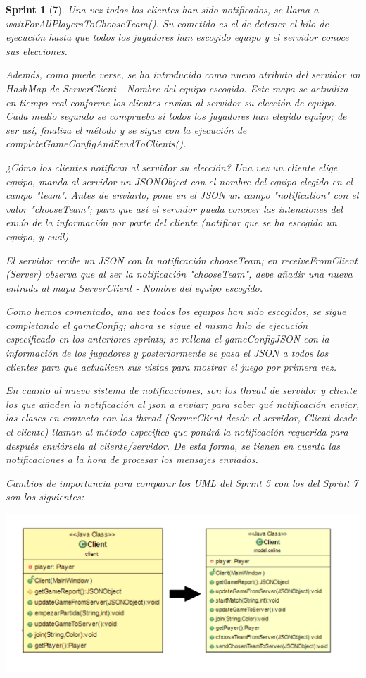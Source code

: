 \documentclass[12pt,a4paper,openright]{book}
\theoremstyle{break}
\newtheorem*{sprint}{Sprint}
\begin{document}
\begin{sprint}[7]
Una vez todos los clientes han sido notificados, se llama a waitForAllPlayersToChooseTeam(). Su cometido es el de detener el hilo de ejecución hasta que todos los jugadores han escogido equipo y el servidor conoce sus elecciones.

Además, como puede verse, se ha introducido como nuevo atributo del servidor un HashMap de ServerClient - Nombre del equipo escogido. Este mapa se actualiza en tiempo real conforme los clientes envían al servidor su elección de equipo. Cada medio segundo se comprueba si todos los jugadores han elegido equipo; de ser así, finaliza el método y se sigue con la ejecución de completeGameConfigAndSendToClients().

¿Cómo los clientes notifican al servidor su elección? Una vez un cliente elige equipo, manda al servidor un JSONObject con el nombre del equipo elegido en el campo "team". Antes de enviarlo, pone en el JSON un campo "notification" con el valor "chooseTeam"; para que así el servidor pueda conocer las intenciones del envío de la información por parte del cliente (notificar que se ha escogido un equipo, y cuál).

El servidor recibe un JSON con la notificación chooseTeam; en receiveFromClient (Server) observa que al ser la notificación "chooseTeam", debe añadir una nueva entrada al mapa ServerClient - Nombre del equipo escogido.

Como hemos comentado, una vez todos los equipos han sido escogidos, se sigue completando el gameConfig; ahora se sigue el mismo hilo de ejecución especificado en los anteriores sprints; se rellena el gameConfigJSON con la información de los jugadores y posteriormente se pasa el JSON a todos los clientes para que actualicen sus vistas para mostrar el juego por primera vez.

En cuanto al nuevo sistema de notificaciones, son los thread de servidor y cliente los que añaden la notificación al json a enviar; para saber qué notificación enviar, las clases en contacto con los thread (ServerClient desde el servidor, Client desde el cliente) llaman al método especifico que pondrá la notificación requerida para después enviársela al cliente/servidor. De esta forma, se tienen en cuenta las notificaciones a la hora de procesar los mensajes enviados.

Cambios de importancia para comparar los UML del Sprint 5 con los del Sprint 7 son los siguientes:

\begin{center}
\includegraphics[scale=0.3]{Client-evol.png} 
\end{center}


\end{sprint}
\end{document}
